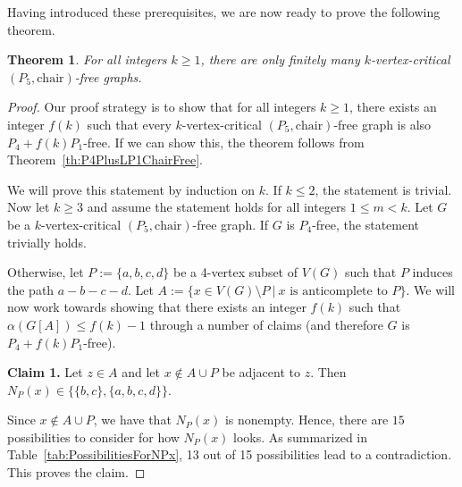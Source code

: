 \documentclass[10pt]{article}
\newtheorem{theorem}[thm]{Theorem}
\theoremstyle{definition}
\begin{document}
Having introduced these prerequisites, we are now ready to prove the following theorem.
\begin{theorem}
\label{th:chair}
    For all integers $k \geq 1$, there are only finitely many $k$-vertex-critical $(P_5,\text{chair})$-free graphs.
\end{theorem}
\begin{proof}
    Our proof strategy is to show that for all integers $k \geq 1$, there exists an integer $f(k)$ such that every $k$-vertex-critical $(P_5,\text{chair})$-free graph is also $P_4+f(k) P_1$-free. If we can show this, the theorem follows from Theorem~\ref{th:P4PlusLP1ChairFree}.

    We will prove this statement by induction on $k$. If $k \leq 2$, the statement is trivial. Now let $k \geq 3$ and assume the statement holds for all integers $1 \leq m<k$. Let $G$ be a $k$-vertex-critical $(P_5,\text{chair})$-free graph. If $G$ is $P_4$-free, the statement trivially holds. 
    
    Otherwise, let $P := \{a,b,c,d\}$ be a 4-vertex subset of $V(G)$ such that $P$ induces the path $a-b-c-d$. Let $A := \{x \in V(G) \setminus P ~|~x\text{ is anticomplete to }P\}$. We will now work towards showing that there exists an integer $f(k)$ such that $\alpha(G[A]) \leq f(k)-1$ through a number of claims (and therefore $G$ is $P_4+f(k)P_1$-free).
    \bigskip 

\noindent \textbf{Claim 1.} Let $z \in A$ and let $x \notin A \cup P$ be adjacent to $z$. Then $N_P(x) \in \{\{b,c\},\{a,b,c,d\}\}$.

\bigskip

Since $x \notin A \cup P$, we have that $N_P(x)$ is nonempty. Hence, there are $15$ possibilities to consider for how $N_P(x)$ looks. As summarized in Table~\ref{tab:PossibilitiesForNPx}, 13 out of 15 possibilities lead to a contradiction. This proves the claim.


\end{proof}
\end{document}
